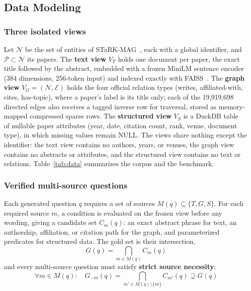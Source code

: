 \documentclass[conference]{IEEEtran}
\begin{document}
\subsection{Data Modeling}\label{sec:data}

\subsubsection{Three isolated views}

Let $\mathcal{N}$ be the set of entities of STaRK-MAG~\cite{wu2024stark,wang2020mag}, each with a global identifier, and $\mathcal{P}\subset \mathcal{N}$ its papers. The \textbf{text view} $V_T$ holds one document per paper, the exact title followed by the abstract, embedded with a frozen MiniLM sentence encoder~\cite{reimers2019sbert,wang2020minilm} (384 dimensions, 256-token input) and indexed exactly with FAISS~\cite{johnson2021faiss}. The \textbf{graph view} $V_G=(\mathcal{N},\mathcal{E})$ holds the four official relation types (writes, affiliated-with, cites, has-topic), where a paper's label is its title only; each of the 19,919,698 directed edges also receives a tagged inverse row for traversal, stored as memory-mapped compressed sparse rows. The \textbf{structured view} $V_S$ is a DuckDB table~\cite{raasveldt2019duckdb} of nullable paper attributes (year, date, citation count, rank, venue, document type), in which missing values remain NULL. The views share nothing except the identifier: the text view contains no authors, years, or venues, the graph view contains no abstracts or attributes, and the structured view contains no text or relations. Table~\ref{tab:data} summarizes the corpus and the benchmark.

\subsubsection{Verified multi-source questions}

Each generated question $q$ requires a set of sources $M(q)\subseteq \{T,G,S\}$. For each required source $m$, a condition is evaluated on the frozen view before any wording, giving a candidate set $C_m (q)$: an exact abstract phrase for text, an authorship, affiliation, or citation path for the graph, and parameterized predicates for structured data. The gold set is their intersection,
\begin{equation}
G(q)=\bigcap_{m\in M(q)} C_m(q)
\label{eq:gold}
\end{equation}
and every multi-source question must satisfy \textbf{strict source necessity}:
\begin{equation}
\forall m\in M(q):\quad G_{-m}(q)=\bigcap_{m'\in M(q)\setminus\{m\}} C_{m'}(q)\supsetneq G(q)
\label{eq:necessity}
\end{equation}
\end{document}
